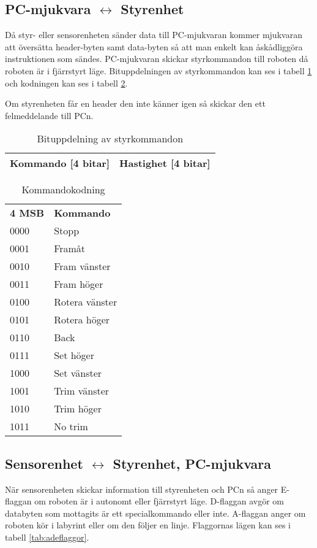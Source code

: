 \subsection{PC-mjukvara $\longleftrightarrow$ Styrenhet}
Då styr- eller sensorenheten sänder data till PC-mjukvaran kommer mjukvaran att
översätta header-byten samt data-byten så att man enkelt kan åskådliggöra
instruktionen som sändes. 
PC-mjukvaran skickar styrkommandon till roboten då roboten är i fjärrstyrt läge.
Bituppdelningen av styrkommandon kan ses i tabell \ref{tab:styrbitar} och
kodningen kan ses i tabell \ref{tab:styrkommando}.

Om styrenheten får en header den inte känner igen så skickar den ett
felmeddelande till PCn.

\begin{table}[h] 
  \centering
  \begin{tabular}{| c | c |}
    \hline
    Kommando [4 bitar] & Hastighet [4 bitar] \\ \hline
  \end{tabular}
  \caption{Bituppdelning av styrkommandon}
  \label{tab:styrbitar}
\end{table}

\begin{table}[h] 
  \centering
  \begin{tabular}{l l}
    \textbf{4 MSB} & \textbf{Kommando} \\
    0000 & Stopp \\
    0001 & Framåt \\
    0010 & Fram vänster \\
    0011 & Fram höger \\
    0100 & Rotera vänster \\
    0101 & Rotera höger \\
    0110 & Back \\
    0111 & Set höger \\
    1000 & Set vänster \\
    1001 & Trim vänster \\
    1010 & Trim höger \\
    1011 & No trim \\
  \end{tabular}
  \caption{Kommandokodning}
  \label{tab:styrkommando}
\end{table}


\subsection{Sensorenhet $\longleftrightarrow$ Styrenhet, PC-mjukvara}
När sensorenheten skickar information till styrenheten och PCn så anger
E-flaggan om roboten är i autonomt eller fjärrstyrt läge.
D-flaggan avgör om databyten som mottagits är ett specialkommando eller inte.
A-flaggan anger om roboten kör i labyrint eller om den följer en linje.
Flaggornas lägen kan ses i tabell \ref{tab:adeflaggor}.

